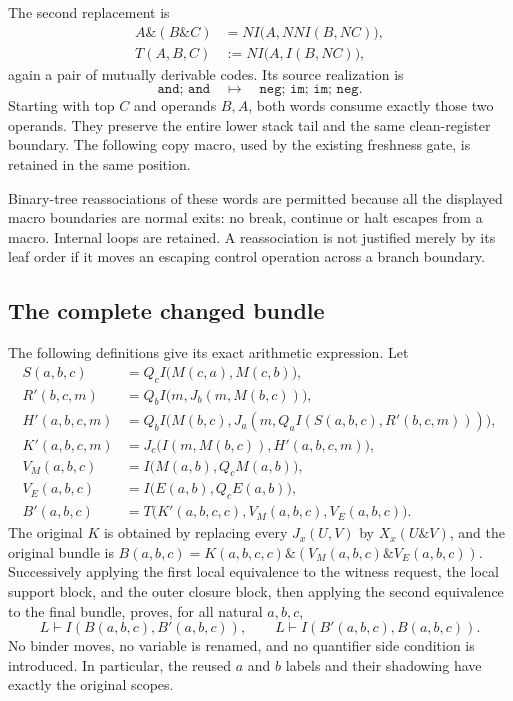 The second replacement is
\begin{align*}
 A\mathbin{\&}(B\mathbin{\&}C)
 &=N I\bigl(A,NN I(B,N C)\bigr),\\
 T(A,B,C)&:=N I\bigl(A,I(B,N C)\bigr),
\end{align*}
again a pair of mutually derivable codes.  Its source realization is
\[
 \texttt{and; and}\quad\longmapsto\quad
 \texttt{neg; im; im; neg}.
\]
Starting with top $C$ and operands $B,A$, both words consume exactly
those two operands.  They preserve the entire lower stack tail and
the same clean-register boundary.  The following copy macro, used by
the existing freshness gate, is retained in the same position.

Binary-tree reassociations of these words are permitted because all
the displayed macro boundaries are normal exits: no break, continue
or halt escapes from a macro.  Internal loops are retained.  A
reassociation is not justified merely by its leaf order if it moves
an escaping control operation across a branch boundary.

\subsection{The complete changed bundle}

The following definitions give its exact arithmetic expression.
Let
\begin{align*}
 S(a,b,c)&=Q_c I\bigl(M(c,a),M(c,b)\bigr),\\
 R'(b,c,m)&=Q_b I\bigl(m,J_b(m,M(b,c))\bigr),\\
 H'(a,b,c,m)&=Q_b I\bigl(M(b,c),
   J_a(m,Q_a I(S(a,b,c),R'(b,c,m)))\bigr),\\
 K'(a,b,c,m)&=J_c\bigl(I(m,M(b,c)),H'(a,b,c,m)\bigr),\\
 V_M(a,b,c)&=I\bigl(M(a,b),Q_cM(a,b)\bigr),\\
 V_E(a,b,c)&=I\bigl(E(a,b),Q_cE(a,b)\bigr),\\
 B'(a,b,c)&=T\bigl(K'(a,b,c,c),V_M(a,b,c),V_E(a,b,c)\bigr).
\end{align*}
The original $K$ is obtained by replacing every $J_x(U,V)$ by
$X_x(U\mathbin{\&}V)$, and the original bundle is
$B(a,b,c)=K(a,b,c,c)\mathbin{\&}(V_M(a,b,c)\mathbin{\&}V_E(a,b,c))$.
Successively applying the first local equivalence to the witness
request, the local support block, and the outer closure block,
then applying the second equivalence to the final bundle,
proves, for all natural $a,b,c$,
\[
 L\vdash I(B(a,b,c),B'(a,b,c)),\qquad
 L\vdash I(B'(a,b,c),B(a,b,c)).                 \tag{DN}
\]
No binder moves, no variable is renamed, and no quantifier side
condition is introduced.  In particular, the reused $a$ and $b$
labels and their shadowing have exactly the original scopes.

